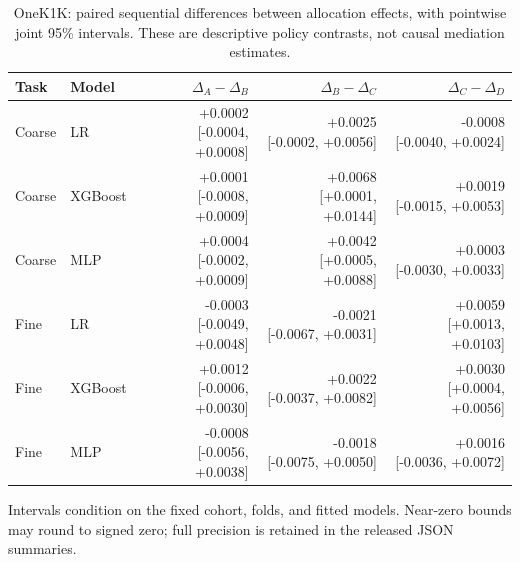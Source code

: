 \begin{table}[htbp]\centering\small
\setlength{\tabcolsep}{5pt}\renewcommand{\arraystretch}{1.2}
\caption{OneK1K: paired sequential differences between allocation effects, with pointwise joint 95\% intervals. These are descriptive policy contrasts, not causal mediation estimates.}
\begin{tabular}{llrrr}\toprule
Task & Model & $\Delta_A-\Delta_B$ & $\Delta_B-\Delta_C$ & $\Delta_C-\Delta_D$ \\\midrule
Coarse & LR & \makecell{+0.0002\\{[-0.0004, +0.0008]}} & \makecell{+0.0025\\{[-0.0002, +0.0056]}} & \makecell{-0.0008\\{[-0.0040, +0.0024]}} \\
Coarse & XGBoost & \makecell{+0.0001\\{[-0.0008, +0.0009]}} & \makecell{+0.0068\\{[+0.0001, +0.0144]}} & \makecell{+0.0019\\{[-0.0015, +0.0053]}} \\
Coarse & MLP & \makecell{+0.0004\\{[-0.0002, +0.0009]}} & \makecell{+0.0042\\{[+0.0005, +0.0088]}} & \makecell{+0.0003\\{[-0.0030, +0.0033]}} \\
Fine & LR & \makecell{-0.0003\\{[-0.0049, +0.0048]}} & \makecell{-0.0021\\{[-0.0067, +0.0031]}} & \makecell{+0.0059\\{[+0.0013, +0.0103]}} \\
Fine & XGBoost & \makecell{+0.0012\\{[-0.0006, +0.0030]}} & \makecell{+0.0022\\{[-0.0037, +0.0082]}} & \makecell{+0.0030\\{[+0.0004, +0.0056]}} \\
Fine & MLP & \makecell{-0.0008\\{[-0.0056, +0.0038]}} & \makecell{-0.0018\\{[-0.0075, +0.0050]}} & \makecell{+0.0016\\{[-0.0036, +0.0072]}} \\
\bottomrule\end{tabular}\end{table}
Intervals condition on the fixed cohort, folds, and fitted models. Near-zero bounds may round to signed zero; full precision is retained in the released JSON summaries.
